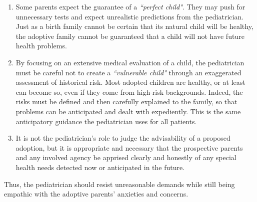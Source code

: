 \begin{enumerate}
    \item Some parents expect the guarantee of a \textit{``perfect child"}. They may push for unnecessary tests and expect unrealistic predictions from the pediatrician. Just as a birth family cannot be certain that its natural child will be healthy, the adoptive family cannot be guaranteed that a child will not have future health problems.
    \item By focusing on an extensive medical evaluation of a child, the pediatrician must be careful not to create a \textit{``vulnerable child"} through an exaggerated assessment of historical risk. Most adopted children are healthy, or at least can become so, even if they come from high-risk backgrounds. Indeed, the risks must be defined and then carefully explained to the family, so that problems can be anticipated and dealt with expediently. This is the same anticipatory guidance the pediatrician uses for all patients.
    \item It is not the pediatrician's role to judge the advisability of a proposed adoption, but it is appropriate and necessary that the prospective parents and any involved agency be apprised clearly and honestly of any special health needs detected now or anticipated in the future.
\end{enumerate}

Thus, the pediatrician should resist unreasonable demands while still being empathic with the adoptive parents' anxieties and concerns.




